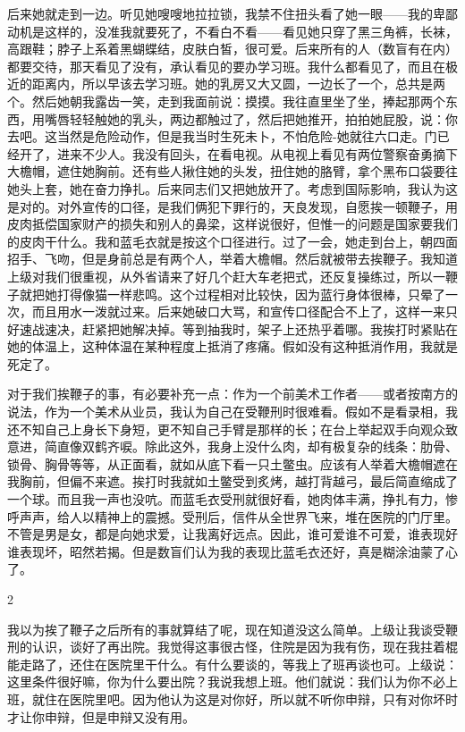 后来她就走到一边。听见她嗖嗖地拉拉锁，我禁不住扭头看了她一眼——我的卑鄙动机是这样的，没准我就要死了，不看白不看——看见她只穿了黑三角裤，长袜，高跟鞋；脖子上系着黑蝴蝶结，皮肤白皙，很可爱。后来所有的人（数盲有在内）都要交待，那天看见了没有，承认看见的要办学习班。我什么都看见了，而且在极近的距离内，所以早该去学习班。她的乳房又大又圆，一边长了一个，总共是两个。然后她朝我露齿一笑，走到我面前说：摸摸。我往直里坐了坐，捧起那两个东西，用嘴唇轻轻触她的乳头，两边都触过了，然后把她推开，拍拍她屁股，说：你去吧。这当然是危险动作，但是我当时生死未卜，不怕危险-她就往六口走。门已经开了，进来不少人。我没有回头，在看电视。从电视上看见有两位警察奋勇摘下大檐帽，遮住她胸前。还有些人揪住她的头发，扭住她的胳臂，拿个黑布口袋要往她头上套，她在奋力挣扎。后来同志们又把她放开了。考虑到国际影响，我认为这是对的。对外宣传的口径，是我们俩犯下罪行的，天良发现，自愿挨一顿鞭子，用皮肉抵偿国家财产的损失和别人的鼻梁，这样说很好，但惟一的问题是国家要我们的皮肉干什么。我和蓝毛衣就是按这个口径进行。过了一会，她走到台上，朝四面招手、飞吻，但是身前总是有两个人，举着大檐帽。然后就被带去挨鞭子。我知道上级对我们很重视，从外省请来了好几个赶大车老把式，还反复操练过，所以一鞭子就把她打得像猫一样悲鸣。这个过程相对比较快，因为蓝行身体很棒，只晕了一次，而且用水一泼就过来。后来她破口大骂，和宣传口径配合不上了，这样一来只好速战速决，赶紧把她解决掉。等到抽我时，架子上还热乎着哪。我挨打时紧贴在她的体温上，这种体温在某种程度上抵消了疼痛。假如没有这种抵消作用，我就是死定了。 

对于我们挨鞭子的事，有必要补充一点：作为一个前美术工作者——或者按南方的说法，作为一个美术从业员，我认为自己在受鞭刑时很难看。假如不是看录相，我还不知自己上身长下身短，更不知自己手臂是那样的长；在台上举起双手向观众致意进，简直像双鹤齐唳。除此这外，我身上没什么肉，却有极复杂的线条：肋骨、锁骨、胸骨等等，从正面看，就如从底下看一只土鳖虫。应该有人举着大檐帽遮在我胸前，但偏不来遮。挨打时我就如土鳖受到炙烤，越打背越弓，最后简直缩成了一个球。而且我一声也没吭。而蓝毛衣受刑就很好看，她肉体丰满，挣扎有力，惨呼声声，给人以精神上的震撼。受刑后，信件从全世界飞来，堆在医院的门厅里。不管是男是女，都是向她求爱，让我离好远点。因此，谁可爱谁不可爱，谁表现好谁表现坏，昭然若揭。但是数盲们认为我的表现比蓝毛衣还好，真是糊涂油蒙了心了。 



2 

我以为挨了鞭子之后所有的事就算结了呢，现在知道没这么简单。上级让我谈受鞭刑的认识，谈好了再出院。我觉得这事很古怪，住院是因为我有伤，现在我拄着棍能走路了，还住在医院里干什么。有什么要谈的，等我上了班再谈也可。上级说：这里条件很好嘛，你为什么要出院？我说我想上班。他们就说：我们认为你不必上班，就住在医院里吧。因为他认为这是对你好，所以就不听你申辩，只有对你坏时才让你申辩，但是申辩又没有用。 

